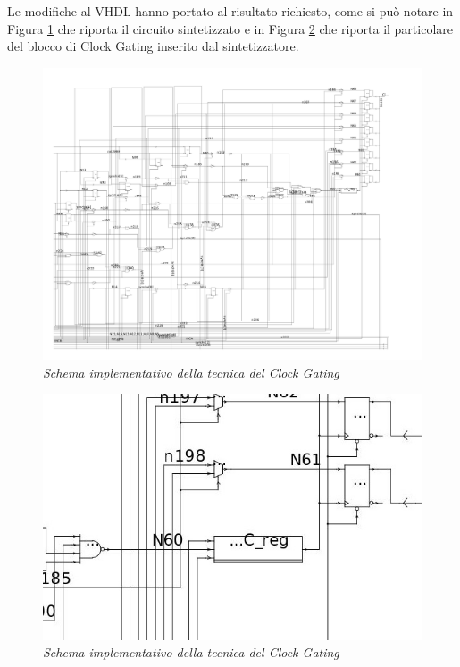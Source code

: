 \noindent Le modifiche al VHDL hanno portato al risultato richiesto, come si può notare in Figura \ref{3_12} che riporta il circuito sintetizzato e in Figura \ref{3_13} che riporta il particolare del blocco di Clock Gating inserito dal sintetizzatore.
\\
\begin{figure}[!htb]
	\centering
	\includegraphics[scale=0.5]{immagini/3_12}
	\caption{\textit{Schema implementativo della tecnica del Clock Gating}}
	\label{3_12}
\end{figure}
\begin{figure}[!htb]
	\centering
	\includegraphics[scale=1.5]{immagini/3_13}
	\caption{\textit{Schema implementativo della tecnica del Clock Gating}}
	\label{3_13}
\end{figure}
\\
